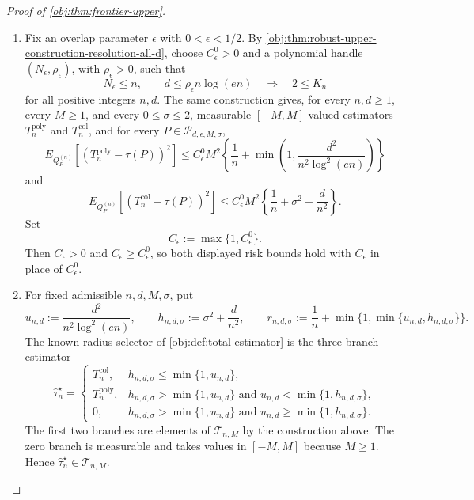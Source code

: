 \documentclass[11pt]{article}
\begin{document}
\begin{proof}[Proof of \cref{obj:thm:frontier-upper}]
\begin{enumerate}
\item Fix an overlap parameter \(\epsilon\) with \(0<\epsilon<1/2\).  By
\cref{obj:thm:robust-upper-construction-resolution-all-d}, choose
\(C_{\epsilon}^{0}>0\) and a polynomial handle
\((N_{\epsilon},\rho_{\epsilon})\), with \(\rho_{\epsilon}>0\), such that
\[
N_{\epsilon}\le n,
\qquad
 d\le \rho_{\epsilon}n\log(en)
\quad\Longrightarrow\quad
2\le K_n
\]
for all positive integers \(n,d\).  The same construction gives, for every
\(n,d\ge1\), every \(M\ge1\), and every \(0\le\sigma\le2\), measurable
\([-M,M]\)-valued estimators \(T_n^{\mathrm{poly}}\) and
\(T_n^{\mathrm{col}}\), and for every
\(P\in\mathcal P_{d,\epsilon,M,\sigma}\),
\[
E_{Q_P^{(n)}}\!\left[
\left(T_n^{\mathrm{poly}}-\tau(P)\right)^2
\right]
\le
C_{\epsilon}^{0}M^2
\left\{
\frac1n+\min\left(1,\frac{d^2}{n^2\log^2(en)}\right)
\right\}
\]
and
\[
E_{Q_P^{(n)}}\!\left[
\left(T_n^{\mathrm{col}}-\tau(P)\right)^2
\right]
\le
C_{\epsilon}^{0}M^2
\left\{
\frac1n+\sigma^2+\frac{d}{n^2}
\right\}.
\]
Set
\[
C_{\epsilon}:=\max\{1,C_{\epsilon}^{0}\}.
\]
Then \(C_{\epsilon}>0\) and \(C_{\epsilon}\ge C_{\epsilon}^{0}\), so both
displayed risk bounds hold with \(C_{\epsilon}\) in place of
\(C_{\epsilon}^{0}\). %

\item For fixed admissible \(n,d,M,\sigma\), put
\[
u_{n,d}:=\frac{d^2}{n^2\log^2(en)},
\qquad
h_{n,d,\sigma}:=\sigma^2+\frac{d}{n^2},
\qquad
r_{n,d,\sigma}:=\frac1n+\min\{1,\min\{u_{n,d},h_{n,d,\sigma}\}\}.
\]
The known-radius selector of \cref{obj:def:total-estimator} is the three-branch
estimator
\[
\widehat\tau_n^{\star}
=
\begin{cases}
T_n^{\mathrm{col}},
& h_{n,d,\sigma}\le \min\{1,u_{n,d}\},\\
T_n^{\mathrm{poly}},
& h_{n,d,\sigma}> \min\{1,u_{n,d}\}
  \text{ and } u_{n,d}<\min\{1,h_{n,d,\sigma}\},\\
0,
& h_{n,d,\sigma}> \min\{1,u_{n,d}\}
  \text{ and } u_{n,d}\ge \min\{1,h_{n,d,\sigma}\}.
\end{cases}
\]
The first two branches are elements of \(\mathcal T_{n,M}\) by the construction
above.  The zero branch is measurable and takes values in \([-M,M]\) because
\(M\ge1\).  Hence \(\widehat\tau_n^{\star}\in\mathcal T_{n,M}\). %


\end{enumerate}
\end{proof}
\end{document}
